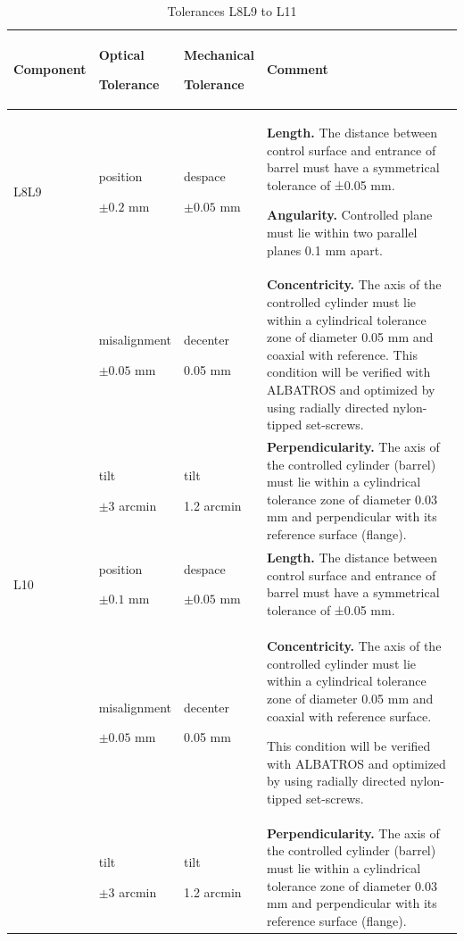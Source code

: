 \documentclass{report}
\begin{document}
\begin{table}
\caption{Tolerances L8L9 to L11}
\label{table:tol_L8-L11}
\begin{center}
\small
\begin{tabular}{lp{2cm}p{2cm}p{7cm}}
\hline
\hline
Component&Optical\par Tolerance&Mechanical\par Tolerance&Comment\\
\hline
L8L9											
&position\par$\pm0.2$ mm&despace\par$\pm0.05$ mm&
\textbf{Length.} The distance between control surface and entrance of barrel must have a symmetrical tolerance of ±0.05 mm.\par
\textbf{Angularity.} Controlled plane must lie within two parallel planes 0.1 mm apart.
\\
&misalignment\par$\pm 0.05$ mm&decenter\par 0.05 mm&
\textbf{Concentricity.} The axis of the controlled cylinder must lie within a cylindrical tolerance zone of diameter 0.05 mm and coaxial with reference.
This condition will be verified with ALBATROS and optimized by using radially directed nylon-tipped set-screws. \\	
&tilt\par$\pm3$ arcmin&tilt\par 1.2 arcmin&
\textbf{Perpendicularity.} The axis of the controlled cylinder (barrel) must lie within a cylindrical tolerance zone of diameter 0.03 mm and perpendicular with its reference surface (flange).\\
\hline
L10
&position\par $\pm 0.1$ mm&despace\par$\pm 0.05$ mm& \textbf{Length.} The distance between control surface and entrance of barrel must have a symmetrical tolerance of ±0.05 mm.\\
&misalignment\par$\pm 0.05$ mm & decenter\par 0.05 mm& \textbf{Concentricity.} The axis of the controlled cylinder must lie within a cylindrical tolerance zone of diameter 0.05 mm and coaxial with reference surface.\par
This condition will be verified with ALBATROS and optimized by using radially directed nylon-tipped set-screws. \\
& tilt\par $\pm 3$ arcmin & tilt\par 1.2 arcmin & \textbf{Perpendicularity.} The axis of the controlled cylinder (barrel) must lie within a cylindrical tolerance zone of diameter 0.03 mm and perpendicular with its reference surface (flange).\\

\end{tabular}
\end{center}
\end{table}
\end{document}
